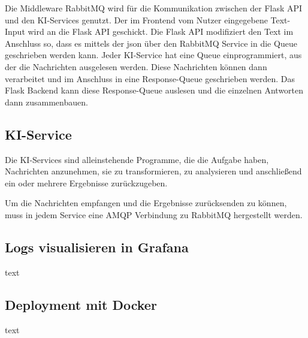 Die Middleware RabbitMQ wird für die Kommunikation zwischen der Flask API und den KI-Services genutzt. Der im Frontend vom Nutzer eingegebene Text-Input wird an die Flask API geschickt. Die Flask API modifiziert den Text im Anschluss so, dass es mittels der \ac{json} über den RabbitMQ Service in die Queue geschrieben werden kann. Jeder KI-Service hat eine Queue einprogrammiert, aus der die Nachrichten ausgelesen werden. Diese Nachrichten können dann verarbeitet und im Anschluss in eine Response-Queue geschrieben werden. Das Flask Backend kann diese Response-Queue auslesen und die einzelnen Antworten dann zusammenbauen.

\subsection{KI-Service}
Die KI-Services sind alleinstehende Programme, die die Aufgabe haben, Nachrichten anzunehmen, sie zu transformieren, zu analysieren und anschließend ein oder mehrere Ergebnisse zurückzugeben. 

Um die Nachrichten empfangen und die Ergebnisse zurücksenden zu können, muss in jedem Service eine AMQP Verbindung zu RabbitMQ hergestellt werden.


\subsection{Logs visualisieren in Grafana}
text

\subsection{Deployment mit Docker}
text
